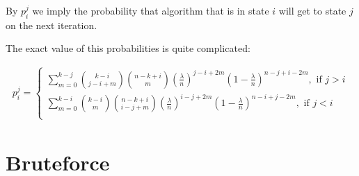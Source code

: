 \documentclass{article}
\begin{document}
By $p_i^j$ we imply the probability that algorithm that is in state $i$ will get to state $j$ on the next iteration.

The exact value of this probabilities is quite complicated:

\begin{align*}
  p_i^j = \begin{cases}
    \sum_{m = 0}^{k - j} \binom{k - i}{j - i + m} \binom{n - k + i}{m} \left(\frac{\lambda}{n}\right)^{j - i + 2m} \left(1 - \frac{\lambda}{n}\right)^{n - j + i - 2m}, \text{ if } j > i \\
      \sum_{m = 0}^{k - i} \binom{k - i}{m} \binom{n - k + i}{i - j + m} \left(\frac{\lambda}{n}\right)^{i - j + 2m} \left(1 - \frac{\lambda}{n}\right)^{n - i + j - 2m}, \text{ if } j < i \\
  \end{cases}
\end{align*}
\section{Bruteforce}
\end{document}
